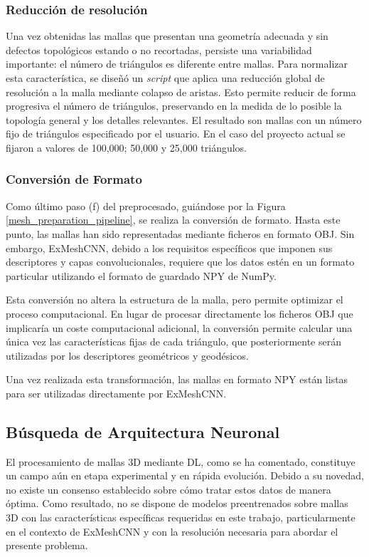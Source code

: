 \subsubsection{Reducción de resolución}
\label{section4:data_reduction}
Una vez obtenidas las mallas que presentan una geometría adecuada y sin defectos topológicos estando o no recortadas, persiste una variabilidad importante: el número de triángulos es diferente entre mallas. Para normalizar esta característica, se diseñó un \textit{script} que aplica una reducción global de resolución a la malla mediante colapso de aristas. Esto permite reducir de forma progresiva el número de triángulos, preservando en la medida de lo posible la topología general y los detalles relevantes. El resultado son mallas con un número fijo de triángulos especificado por el usuario. En el caso del proyecto actual se fijaron a valores de 100,000; 50,000 y 25,000 triángulos.

\subsubsection{Conversión de Formato}
Como último paso (f) del preprocesado, guiándose por la Figura \ref{mesh_preparation_pipeline}, se realiza la conversión de formato. Hasta este punto, las mallas han sido representadas mediante ficheros en formato OBJ. Sin embargo, ExMeshCNN, debido a los requisitos específicos que imponen sus descriptores y capas convolucionales, requiere que los datos estén en un formato particular utilizando el formato de guardado NPY de NumPy.

Esta conversión no altera la estructura de la malla, pero permite optimizar el proceso computacional. En lugar de procesar directamente los ficheros OBJ que implicaría un coste computacional adicional, la conversión permite calcular una única vez las características fijas de cada triángulo, que posteriormente serán utilizadas por los descriptores geométricos y geodésicos.

Una vez realizada esta transformación, las mallas en formato NPY están listas para ser utilizadas directamente por ExMeshCNN.

\subsection{Búsqueda de Arquitectura Neuronal}
\label{section4:nas}
El procesamiento de mallas 3D mediante DL, como se ha comentado, constituye un campo aún en etapa experimental y en rápida evolución. Debido a su novedad, no existe un consenso establecido sobre cómo tratar estos datos de manera óptima. Como resultado, no se dispone de modelos preentrenados sobre mallas 3D con las características específicas requeridas en este trabajo, particularmente en el contexto de ExMeshCNN y con la resolución necesaria para abordar el presente problema.

